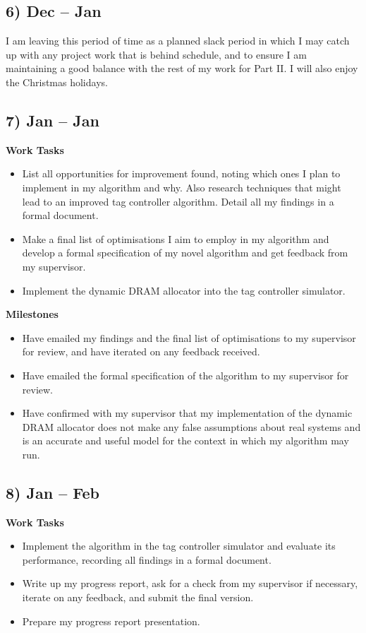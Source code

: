\documentclass[10pt,a4paper]{article}
\begin{document}
\subsection*{6)  Dec --  Jan}
I am leaving this period of time as a planned slack period in which I may catch up with any project work that is behind schedule, and to ensure I am maintaining a good balance with the rest of my work for Part II. I will also enjoy the Christmas holidays.

\subsection*{7)  Jan --  Jan}
\textbf{Work Tasks}
\begin{itemize}
	\item List all opportunities for improvement found, noting which ones I plan to implement in my algorithm and why. Also research techniques that might lead to an improved tag controller algorithm. Detail all my findings in a formal document.
	\item Make a final list of optimisations I aim to employ in my algorithm and develop a formal specification of my novel algorithm and get feedback from my supervisor.
	\item Implement the dynamic DRAM allocator into the tag controller simulator.
\end{itemize}

\textbf{Milestones}
\begin{itemize}
	\item Have emailed my findings and the final list of optimisations to my supervisor for review, and have iterated on any feedback received.
	\item Have emailed the formal specification of the algorithm to my supervisor for review.
	\item Have confirmed with my supervisor that my implementation of the dynamic DRAM allocator does not make any false assumptions about real systems and is an accurate and useful model for the context in which my algorithm may run.
\end{itemize}

\subsection*{8)  Jan --  Feb}
\textbf{Work Tasks}
\begin{itemize}
	\item Implement the algorithm in the tag controller simulator and evaluate its performance, recording all findings in a formal document.
	\item Write up my progress report, ask for a check from my supervisor if necessary, iterate on any feedback, and submit the final version.
	\item Prepare my progress report presentation.
\end{itemize}
\end{document}
